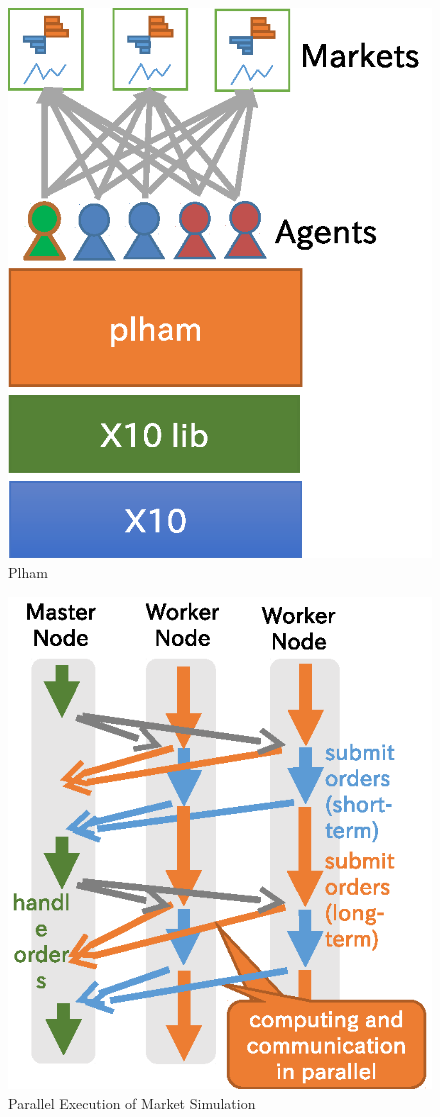 \begin{figure}
  \centering
  \includegraphics[width=.8\linewidth]{Figs.noda/figure-05.plham.eps}
  \caption{Plham}
  \label{fig:Figs.noda/figure-05.plham.eps}
\end{figure}

\begin{figure}
  \centering
  \includegraphics[width=.8\linewidth]{Figs.noda/figure-06.market_para.eps}
  \caption{Parallel Execution of Market Simulation}
  \label{fig:Figs.noda/figure-06.market_para.eps}
\end{figure}


